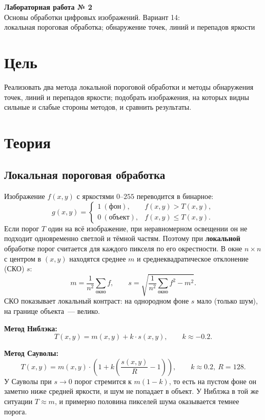 \documentclass[11pt,a4paper]{article}
\begin{document}
\begin{center}
  {\LARGE\bfseries Лабораторная работа № 2}\\[0.4em]
  {\large Основы обработки цифровых изображений. Вариант 14:\\
  локальная пороговая обработка; обнаружение точек, линий и перепадов яркости}
\end{center}

\section{Цель}
Реализовать два метода локальной пороговой обработки и методы обнаружения
точек, линий и перепадов яркости; подобрать изображения, на которых видны
сильные и слабые стороны методов, и сравнить результаты.

\section{Теория}

\subsection{Локальная пороговая обработка}
Изображение $f(x, y)$ с яркостями $0\text{–}255$ переводится в бинарное:
\[
  g(x, y) = \begin{cases} 1\ (\text{фон}), & f(x, y) > T(x, y),\\ 0\ (\text{объект}), & f(x, y) \le T(x, y). \end{cases}
\]
Если порог $T$ один на всё изображение, при неравномерном освещении он не
подходит одновременно светлой и тёмной частям. Поэтому при \textbf{локальной}
обработке порог считается для каждого пикселя по его окрестности. В окне
$n \times n$ с центром в $(x, y)$ находятся среднее $m$ и среднеквадратическое
отклонение (СКО) $s$:
\[
  m = \frac{1}{n^2} \sum_{\text{окно}} f, \qquad
  s = \sqrt{\frac{1}{n^2} \sum_{\text{окно}} f^2 - m^2}.
\]
СКО показывает локальный контраст: на однородном фоне $s$ мало (только шум),
на границе объекта~— велико.

\textbf{Метод Ниблэка:}
\[ T(x, y) = m(x, y) + k \cdot s(x, y), \qquad k \approx -0.2. \]

\textbf{Метод Сауволы:}
\[ T(x, y) = m(x, y) \cdot \left(1 + k \left(\frac{s(x, y)}{R} - 1\right)\right), \qquad k \approx 0.2,\ R = 128. \]
У Сауволы при $s \to 0$ порог стремится к $m(1 - k)$, то есть на пустом фоне
он заметно ниже средней яркости, и шум не попадает в объект. У Ниблэка
в той же ситуации $T \approx m$, и примерно половина пикселей шума
оказывается темнее порога.
\end{document}

